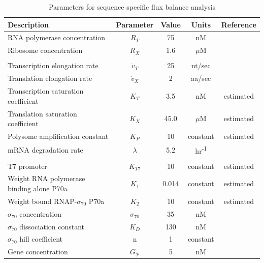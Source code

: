 \documentclass[journal=asbcd6,manuscript=article]{achemso}
\begin{document}
\clearpage

\begin{table}
\centering
    \caption{Parameters for sequence specific flux balance analysis}
    \renewcommand{\arraystretch}{1}
    \begin{tabular}{lcccc} \toprule
        \textbf{Description} & \textbf{Parameter} & \textbf{Value} & \textbf{Units} & \textbf{Reference} \\ \toprule
        RNA polymerase concentration & $R_{T}$ & 75 & nM & \cite{Garamella:2016aa} \\
        Ribosome concentration & $R_{X}$ & 1.6 & $\mu$M & \cite{Garamella:2016aa, 2005_underwood_biotech} \\

        & & & & \\
        Transcription elongation rate & $\dot{v}_{T}$ & 25 & nt/sec & \cite{Garamella:2016aa} \\
        Translation elongation rate & $\dot{v}_{X}$ & 2 & aa/sec & \cite{Garamella:2016aa, 2005_underwood_biotech} \\
        Transcription saturation coefficient & $K_{T}$ & 3.5 & nM & estimated \\
        Translation saturation coefficient & $K_{X}$ & 45.0 & $\mu$M & estimated \\
        Polysome amplification constant & $K_{P}$ & 10 & constant & estimated \\
        mRNA degradation rate & $\lambda$ & 5.2 & hr\textsuperscript{-1} & \cite{Garamella:2016aa} \\

        & & & & \\
        T7 promoter & $K_{T7}$ & 10 & constant & estimated \\
        Weight RNA polymerase binding alone P70a & $K_{1}$ & 0.014 & constant & estimated \\
        Weight bound RNAP-$\sigma_{70}$ P70a & $K_{2}$ & 10 & constant & estimated \\
        $\sigma_{70}$ concentration & $\sigma_{70}$ & 35 & nM & \cite{Garamella:2016aa} \\
        $\sigma_{70}$ dissociation constant & $K_{D}$ & 130 & nM & \cite{Mauri:2014aa} \\
	      $\sigma_{70}$ hill coefficient & n & 1 & constant & \cite{Mauri:2014aa} \\
        Gene concentration & $G_{\mathcal{P}}$ & 5 & nM &  \cite{Garamella:2016aa} \\ \bottomrule

    \end{tabular}
\label{tbl:parameters}
\end{table}
\end{document}
